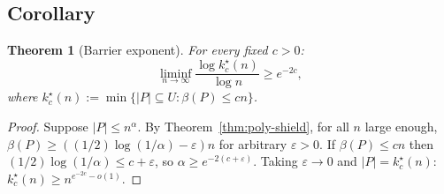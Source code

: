 \documentclass{article}
\newtheorem{theorem}{Theorem}
\begin{document}
\subsection{Corollary}

\begin{theorem}[Barrier exponent]
For every fixed $c > 0$:
\[\liminf_{n \to \infty} \frac{\log k_c^\star(n)}{\log n} \ge e^{-2c},\]
where $k_c^\star(n) := \min\{|P| \subseteq U : \beta(P) \le cn\}$.
\end{theorem}

\begin{proof}
Suppose $|P| \le n^\alpha$. By Theorem~\ref{thm:poly-shield}, for all $n$ large enough, $\beta(P) \ge ((1/2) \log(1/\alpha) - \varepsilon)n$ for arbitrary $\varepsilon > 0$. If $\beta(P) \le cn$ then $(1/2)\log(1/\alpha) \le c + \varepsilon$, so $\alpha \ge e^{-2(c+\varepsilon)}$. Taking $\varepsilon \to 0$ and $|P| = k_c^\star(n)$: $k_c^\star(n) \ge n^{e^{-2c} - o(1)}$.
\end{proof}
\end{document}
